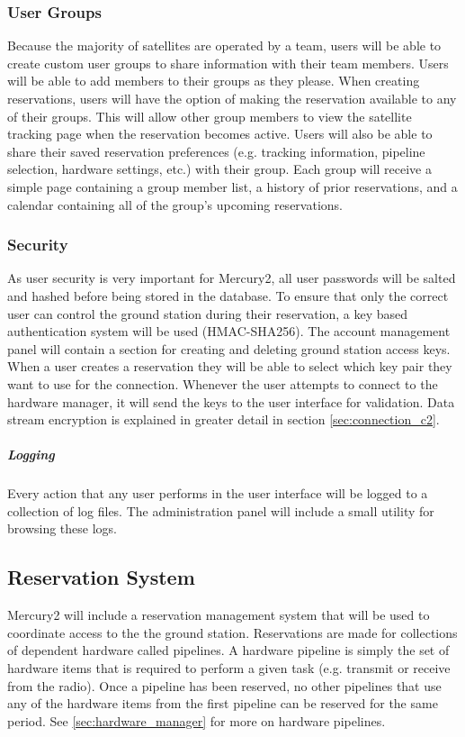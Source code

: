 \documentclass{mxl-design}
\begin{document}
\subsubsection{User Groups}
\label{sec:user_groups}
Because the majority of satellites are operated by a team, users will be able to create custom user groups to share information with their team members. Users will be able to add members to their groups as they please. When creating reservations, users will have the option of making the reservation available to any of their groups. This will allow other group members to view the satellite tracking page when the reservation becomes active. Users will also be able to share their saved reservation preferences (e.g. tracking information, pipeline selection, hardware settings, etc.) with their group. Each group will receive a simple page containing a group member list, a history of prior reservations, and a calendar containing all of the group's upcoming reservations.

\subsubsection{Security}
\label{sec:user_security}
As user security is very important for Mercury2, all user passwords will be salted and hashed before being stored in the database. To ensure that only the correct user can control the ground station during their reservation, a key based authentication system will be used (HMAC-SHA256). The account management panel will contain a section for creating and deleting ground station access keys. When a user creates a reservation they will be able to select which key pair they want to use for the connection. Whenever the user attempts to connect to the hardware manager, it will send the keys to the user interface for validation. Data stream encryption is explained in greater detail in section \ref{sec:connection_c2}.

\subparagraph{Logging}
Every action that any user performs in the user interface will be logged to a collection of log files. The administration panel will include a small utility for browsing these logs. 

\subsection{Reservation System}
\label{sec:reservations}
Mercury2 will include a reservation management system that will be used to coordinate access to the the ground station. Reservations are made for collections of dependent hardware called pipelines. A hardware pipeline is simply the set of hardware items that is required to perform a given task (e.g. transmit or receive from the radio). Once a pipeline has been reserved, no other pipelines that use any of the hardware items from the first pipeline can be reserved for the same period. See \ref{sec:hardware_manager} for more on hardware pipelines.
\end{document}
